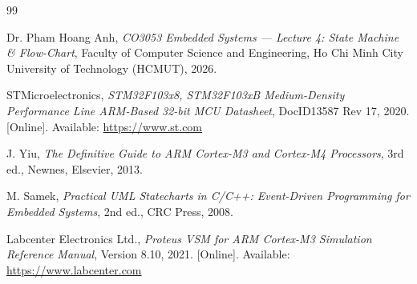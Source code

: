 \documentclass[12pt]{article}
\begin{document}
\begin{thebibliography}{99}

Dr. Pham Hoang Anh, 
\textit{CO3053 Embedded Systems --- Lecture 4: State Machine \& Flow-Chart}, 
Faculty of Computer Science and Engineering, Ho Chi Minh City University of Technology (HCMUT), 2026.

STMicroelectronics, 
\textit{STM32F103x8, STM32F103xB Medium-Density Performance Line ARM-Based 32-bit MCU Datasheet}, 
DocID13587 Rev 17, 2020. [Online]. Available: \url{https://www.st.com}

J. Yiu, 
\textit{The Definitive Guide to ARM Cortex-M3 and Cortex-M4 Processors}, 
3rd ed., Newnes, Elsevier, 2013.

M. Samek, 
\textit{Practical UML Statecharts in C/C++: Event-Driven Programming for Embedded Systems}, 
2nd ed., CRC Press, 2008.

Labcenter Electronics Ltd., 
\textit{Proteus VSM for ARM Cortex-M3 Simulation Reference Manual}, 
Version 8.10, 2021. [Online]. Available: \url{https://www.labcenter.com}

\end{thebibliography}
\end{document}
